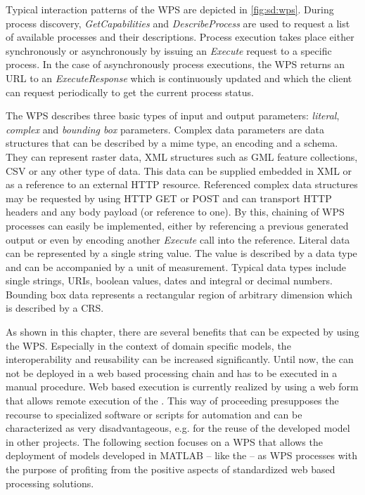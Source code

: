   Typical interaction patterns of the \acl{WPS} are depicted in \cref{fig:sd:wps}. During process discovery, \emph{GetCapabilities} and \emph{DescribeProcess} are used to request a list of available processes and their descriptions. Process execution takes place either synchronously or asynchronously by issuing an \emph{Execute} request to a specific process. In the case of asynchronously process executions, the \ac{WPS} returns an URL to an \emph{ExecuteResponse} which is continuously updated and which the client can request periodically to get the current process status.

  The \ac{WPS} describes three basic types of input and output parameters: \emph{literal}, \emph{complex} and \emph{bounding box} parameters. Complex data parameters are data structures that can be described by a mime type, an encoding and a schema. They can represent raster data, XML structures such as \ac{GML} \citep{ogc:gml} feature collections, \ac{CSV} or any other type of data. This data can be supplied embedded in XML or as a reference to an external HTTP resource. Referenced complex data structures may be requested by using HTTP GET or POST and can transport HTTP headers and any body payload (or reference to one). By this, chaining of \ac{WPS} processes can easily be implemented, either by referencing a previous generated output or even by encoding another \emph{Execute} call into the reference. Literal data can be represented by a single string value. The value is described by a data type and can be accompanied by a unit of measurement. Typical data types include single strings, URIs, boolean values, dates and integral or decimal numbers. Bounding box data represents a rectangular region of arbitrary dimension which is described by a \ac{CRS}.

  As shown in this chapter, there are several benefits that can be expected by using the WPS. Especially in the context of domain specific models, the interoperability and reusability can be increased significantly. Until now, the \la can not be deployed in a web based processing chain and has to be executed in a manual procedure. Web based execution is currently realized by using a web form that allows remote execution of the \la. This way of proceeding presupposes the recourse to specialized software or scripts for automation and can be characterized as very disadvantageous, e.g. for the reuse of the developed model in other projects. The following section focuses on a WPS that allows the deployment of models developed in MATLAB -- like the \la -- as WPS processes with the purpose of profiting from the positive aspects of standardized web based processing solutions.

